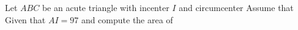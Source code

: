 Let $ABC$ be an acute triangle with incenter $I$ and circumcenter  Assume that  Given that $AI = 97$ and  compute the area of 
